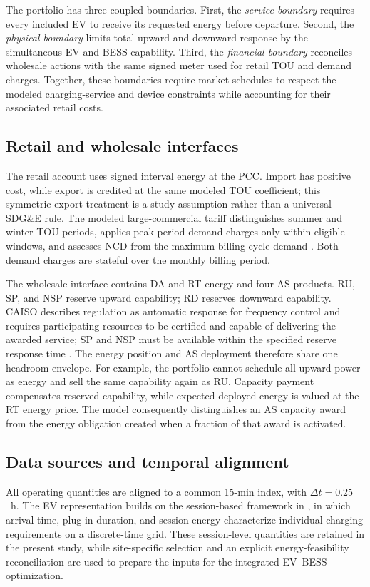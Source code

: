 \documentclass[final,5p,times]{elsarticle}
\newcommand{\dt}{\Delta t}
\begin{document}
The portfolio has three coupled boundaries. First, the
\emph{service boundary} requires every included EV to
receive its requested energy before departure. Second,
the \emph{physical boundary} limits total upward and
downward response by the simultaneous EV and BESS
capability. Third, the \emph{financial boundary} reconciles
wholesale actions with the same signed meter used for
retail TOU and demand charges. Together, these boundaries
require market schedules to respect the modeled
charging-service and device constraints while accounting
for their associated retail costs.

\subsection{Retail and wholesale interfaces}
The retail account uses signed interval energy at the PCC. Import has positive cost, while export is credited at the same modeled TOU coefficient; this symmetric export treatment is a study assumption rather than a universal SDG\&E rule. The modeled large-commercial tariff distinguishes summer and winter TOU periods, applies peak-period demand charges only within eligible windows, and assesses NCD from the maximum billing-cycle demand \cite{sdgeLargeCommercial2025} \cite{sdgeDemandGuide2026}. Both demand charges are stateful over the monthly billing period.

The wholesale interface contains DA and RT energy and four AS products. RU, SP, and NSP reserve upward capability; RD reserves downward capability. CAISO describes regulation as automatic response for frequency control and requires participating resources to be certified and capable of delivering the awarded service; SP and NSP must be available within the specified reserve response time \cite{caisoAncillary2026}. The energy position and AS deployment therefore share one headroom envelope. For example, the portfolio cannot schedule all upward power as energy and sell the same capability again as RU. Capacity payment compensates reserved capability, while expected deployed energy is valued at the RT energy price. The model consequently distinguishes an AS capacity award from the energy obligation created when a fraction of that award is activated.

\subsection{Data sources and temporal alignment}
All operating quantities are aligned to a common 15-min index,
with $\dt=0.25$~h. The EV representation builds on the
session-based framework in \cite{chen2026realtime}, in which
arrival time, plug-in duration, and session energy characterize
individual charging requirements on a discrete-time grid.
These session-level quantities are retained in the present
study, while site-specific selection and an explicit
energy-feasibility reconciliation are used to prepare the
inputs for the integrated EV--BESS optimization.
\end{document}
